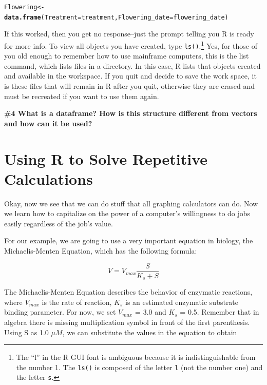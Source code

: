 \documentclass{tufte-handout}\usepackage[]{graphicx}\usepackage[]{color}
\makeatletter
\newcommand{\hlstd}[1]{\textcolor[rgb]{0.345,0.345,0.345}{#1}}%
\newcommand{\hlkwb}[1]{\textcolor[rgb]{0.69,0.353,0.396}{#1}}%
\newcommand{\hlkwc}[1]{\textcolor[rgb]{0.333,0.667,0.333}{#1}}%
\newcommand{\hlkwd}[1]{\textcolor[rgb]{0.737,0.353,0.396}{\textbf{#1}}}%
\newenvironment{kframe}{%
 \def\at@end@of@kframe{}%
 \ifinner\ifhmode%
  \def\at@end@of@kframe{\end{minipage}}%
  \begin{minipage}{\columnwidth}%
 \fi\fi%
 \def\FrameCommand##1{\hskip\@totalleftmargin \hskip-\fboxsep
 \colorbox{shadecolor}{##1}\hskip-\fboxsep
     \hskip-\linewidth \hskip-\@totalleftmargin \hskip\columnwidth}%
 \MakeFramed {\advance\hsize-\width
   \@totalleftmargin\z@ \linewidth\hsize
   \@setminipage}}%
 {\par\unskip\endMakeFramed%
 \at@end@of@kframe}
\newenvironment{knitrout}{}{} %
\makeatother
\begin{document}
\begin{knitrout}
\color{fgcolor}\begin{kframe}
\begin{alltt}
\hlstd{Flowering} \hlkwb{<-} \hlkwd{data.frame}\hlstd{(}\hlkwc{Treatment} \hlstd{= treatment,} \hlkwc{Flowering_date} \hlstd{= flowering_date)}
\end{alltt}
\end{kframe}
\end{knitrout}



If this worked, then you get no response--just the prompt telling you R is ready for more info. To view all objects you have created, type \texttt{ls()}.\footnote{The ``l'' in the R GUI font is ambiguous because it is indistinguishable from the number 1. The \texttt{ls()} is composed of the letter \texttt{l} (not the number one) and the letter \texttt{s}.} Yes, for those of you old enough to remember how to use mainframe computers, this is the list command, which lists files in a directory. In this case, R lists that objects created and available in the workspace. If you quit and decide to save the work space, it is these files that will remain in R after you quit, otherwise they are erased and must be recreated if you want to use them again.  

\bigskip
\noindent \textbf{\#4 What is a dataframe?  How is this structure different from vectors and how can it be used?}

\section{Using R to Solve Repetitive Calculations}

Okay, now we see that we can do stuff that all graphing calculators can do. Now we learn how to capitalize on the power of a computer's willingness to do jobs easily regardless of the job's value. 

For our example, we are going to use a very important equation in biology, the Michaelis-Menten Equation, which has the following formula:

\begin{equation}
V = V_{max}\frac{S}{K_s + S}
\end{equation}

The Michaelis-Menten Equation describes the behavior of enzymatic reactions, where $V_{max}$ is the rate of reaction, $K_s$ is an estimated enzymatic substrate binding parameter. For now, we set $V_{max}$ = 3.0 and $K_s$ = 0.5. Remember that in algebra there is missing multiplication symbol in front of the first parenthesis. Using S as 1.0 $\mu M$, we can substitute the values in the equation to obtain
\end{document}
